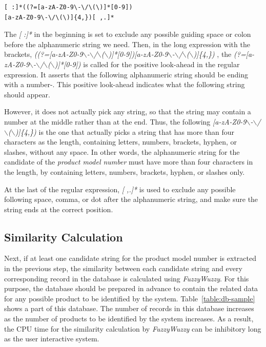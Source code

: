 \documentclass[technicalreport]{ieicej}
\begin{document}
            \begin{center}
            \begin{BVerbatim}
[ :]*((?=[a-zA-Z0-9\-\/\(\)]*[0-9])
[a-zA-Z0-9\-\/\(\)]{4,})[ ,.]*
            \end{BVerbatim}
            \end{center}
    
        The {\em [ :]*} in the beginning is set to exclude any possible guiding space or colon before the alphanumeric string we need. Then, in the long expression with the brackets, {\em ((?=[a-zA-Z0-9$\backslash$-$\backslash$/$\backslash$($\backslash$)]*[0-9])[a-zA-Z0-9$\backslash$-$\backslash$/$\backslash$($\backslash$)]\{4,\}) }, the {\em (?=[a-zA-Z0-9$\backslash$-$\backslash$/$\backslash$($\backslash$)]*[0-9])} is called for the positive look-ahead in the regular expression. It asserts that the following alphanumeric string should be ending with a number\cite{lookahead}-\cite{regex-tutorial}. This positive look-ahead indicates what the following string should appear. 

        However, it does not actually pick any string, so that the string may contain a number at the middle rather than at the end. Thus, the following {\em [a-zA-Z0-9$\backslash$-$\backslash$/$\backslash$($\backslash$)]\{4,\})} is the one that actually picks a string that has more than four characters as the length, containing letters, numbers, brackets, hyphen, or slashes, without any space. In other words, the alphanumeric string for the candidate of the {\em product model number} must have more than four characters in the length, by containing letters, numbers, brackets, hyphen, or slashes only.

        At the last of the regular expression, {\em [ ,.]*} is used to exclude any possible following space, comma, or dot after the alphanumeric string, and make sure the string ends at the correct position.

        
\subsection{Similarity Calculation}
    \label{sec:algorithm.ocrregex}
        Next, if at least one candidate string for the product model number is extracted in the previous step, the similarity between each candidate string and every corresponding record in the database is calculated using {\em FuzzyWuzzy}. For this purpose, the database should be prepared in advance to contain the related data for any possible product to be identified by the system. Table~\ref{table:db-sample} shows a part of this database. The number of records in this database increases as the number of products to be identified by the system increases. As a result, the CPU time for the similarity calculation by {\em FuzzyWuzzy} can be inhibitory long as the user interactive system.
\end{document}
